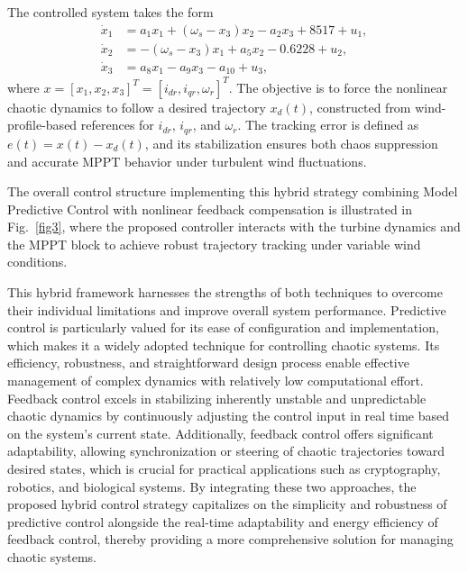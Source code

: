 \documentclass[conference]{IEEEtran}
\begin{document}
The controlled system takes the form
\begin{equation}
\begin{aligned}
\dot{x}_{1} &= a_{1}x_{1} + \left( \omega_{s} - x_{3} \right)x_{2} - a_{2}x_{3} + 8517 + u_{1}, \\
\dot{x}_{2} &= - \left( \omega_{s} - x_{3} \right)x_{1} + a_{5}x_{2} - 0.6228 + u_{2}, \\
\dot{x}_{3} &= a_{8}x_{1} - a_{9}x_{3} - a_{10} + u_{3},
\end{aligned}
\label{eq18}
\end{equation}
where $x = \left\lbrack x_{1},x_{2},x_{3} \right\rbrack^{T} = \left\lbrack i_{dr},i_{qr},\omega_{r} \right\rbrack^{T}$. The objective is to force the nonlinear chaotic dynamics to follow a desired trajectory $x_{d}(t)$, constructed from wind-profile-based references for $i_{dr}$, $i_{qr}$, and $\omega_{r}$. The tracking error is defined as $e(t) = x(t) - x_{d}(t)$, and its stabilization ensures both chaos suppression and accurate MPPT behavior under turbulent wind fluctuations.

The overall control structure implementing this hybrid strategy combining Model Predictive Control with nonlinear feedback compensation is illustrated in Fig.~\ref{fig3}, where the proposed controller interacts with the turbine dynamics and the MPPT block to achieve robust trajectory tracking under variable wind conditions.

This hybrid framework harnesses the strengths of both techniques to overcome their individual limitations and improve overall system performance. Predictive control \cite{b25,b26,b27,b28,b29,b30} is particularly valued for its ease of configuration and implementation, which makes it a widely adopted technique for controlling chaotic systems. Its efficiency, robustness, and straightforward design process enable effective management of complex dynamics with relatively low computational effort. Feedback control excels in stabilizing inherently unstable and unpredictable chaotic dynamics by continuously adjusting the control input in real time based on the system's current state. Additionally, feedback control \cite{b31,b32} offers significant adaptability, allowing synchronization or steering of chaotic trajectories toward desired states, which is crucial for practical applications such as cryptography, robotics, and biological systems. By integrating these two approaches, the proposed hybrid control strategy capitalizes on the simplicity and robustness of predictive control alongside the real-time adaptability and energy efficiency of feedback control, thereby providing a more comprehensive solution for managing chaotic systems.
\end{document}
